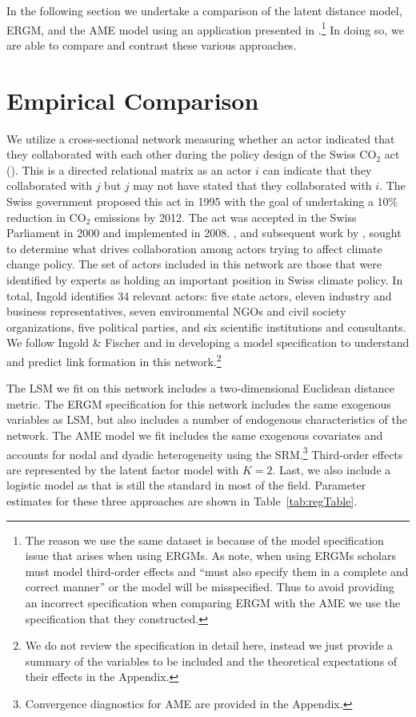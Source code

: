 \documentclass[12pt,pdflatex]{elsarticle}
\begin{document}
In the following section we undertake a comparison of the latent distance model, ERGM, and the AME model using an application presented in \citet{cranmer:etal:2016}.\footnote{The reason we use the same dataset is because of the model specification issue that arises when using ERGMs. As \citet[p. 8]{cranmer:etal:2016} note, when using ERGMs scholars must model third-order effects and ``must also specify them in a complete and correct manner'' or the model will be misspecified. Thus to avoid providing an incorrect specification when comparing ERGM with the AME we use the specification that they constructed.} In doing so, we are able to compare and contrast these various approaches.

\section*{\textbf{Empirical Comparison}}

We utilize a cross-sectional network measuring whether an actor indicated that they collaborated with each other during the policy design of the Swiss CO$_{2}$ act (\citealt{ingold:2008}). This is a directed relational matrix as an actor $i$ can indicate that they collaborated with $j$ but $j$ may not have stated that they collaborated with $i$. The Swiss government proposed this act in 1995 with the goal of undertaking a 10\% reduction in CO$_{2}$ emissions by 2012. The act was accepted in the Swiss Parliament in 2000 and implemented in 2008. \citet{ingold:2008}, and subsequent work by \citet{ingold:fischer:2014}, sought to determine what drives collaboration among actors trying to affect climate change policy. The set of actors included in this network are those that were identified by experts as holding an important position in Swiss climate policy. In total, Ingold identifies 34 relevant actors: five state actors, eleven industry and business representatives, seven environmental NGOs and civil society organizations, five political parties, and six scientific institutions and consultants. We follow Ingold \& Fischer and \citet{cranmer:etal:2016} in developing a model specification to understand and predict link formation in this network.\footnote{We do not review the specification in detail here, instead we just provide a summary of the variables to be included and the theoretical expectations of their effects in the Appendix.}

The LSM we fit on this network includes a two-dimensional Euclidean distance metric. The ERGM specification for this network includes the same exogenous variables as LSM, but also includes a number of endogenous characteristics of the network. The AME model we fit includes the same exogenous covariates and accounts for nodal and dyadic heterogeneity using the SRM.\footnote{Convergence diagnostics for AME are provided in the Appendix.} Third-order effects are represented by the latent factor model with $K=2$. Last, we also include a logistic model as that is still the standard in most of the field. Parameter estimates for these three approaches are shown in Table~\ref{tab:regTable}.
\end{document}
